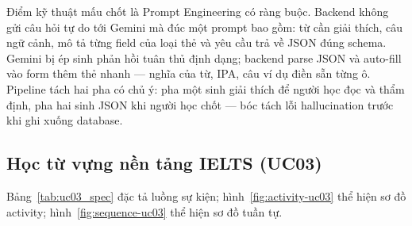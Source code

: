 \begin{sloppypar}
Điểm kỹ thuật mấu chốt là Prompt Engineering có ràng buộc. Backend không gửi câu hỏi tự do tới Gemini mà đúc một prompt bao gồm: từ cần giải thích, câu ngữ cảnh, mô tả từng field của loại thẻ và yêu cầu trả về JSON đúng schema. Gemini bị ép sinh phản hồi tuân thủ định dạng; backend parse JSON và auto-fill vào form thêm thẻ nhanh --- nghĩa của từ, IPA, câu ví dụ điền sẵn từng ô. Pipeline tách hai pha có chủ ý: pha một sinh giải thích để người học đọc và thẩm định, pha hai sinh JSON khi người học chốt --- bóc tách lỗi hallucination trước khi ghi xuống database.
\end{sloppypar}

\subsection{Học từ vựng nền tảng IELTS (UC03)}
Bảng~\ref{tab:uc03_spec} đặc tả luồng sự kiện; hình~\ref{fig:activity-uc03} thể hiện sơ đồ activity; hình~\ref{fig:sequence-uc03} thể hiện sơ đồ tuần tự.
